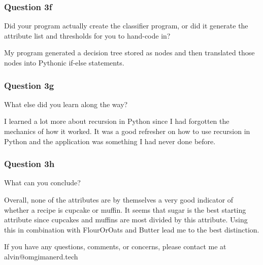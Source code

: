 \documentclass{math}
\begin{document}
\subsubsection*{Question 3f}
Did your program actually create the classifier program, or did it generate
the attribute list and thresholds for you to hand-code in? \par
My program generated a decision tree stored as nodes and then translated those
nodes into Pythonic if-else statements.

\subsubsection*{Question 3g}
What else did you learn along the way? \par
I learned a lot more about recursion in Python since I had forgotten the
mechanics of how it worked. It was a good refresher on how to use recursion in
Python and the application was something I had never done before.

\subsubsection*{Question 3h}
What can you conclude? \par
Overall, none of the attributes are by themselves a very good indicator of
whether a recipe is cupcake or muffin. It seems that sugar is the best starting
attribute since cupcakes and muffins are most divided by this attribute. Using
this in combination with FlourOrOats and Butter lead me to the best distinction.

\begin{center}
  If you have any questions, comments, or concerns, please contact me at
  alvin@omgimanerd.tech
\end{center}
\end{document}

